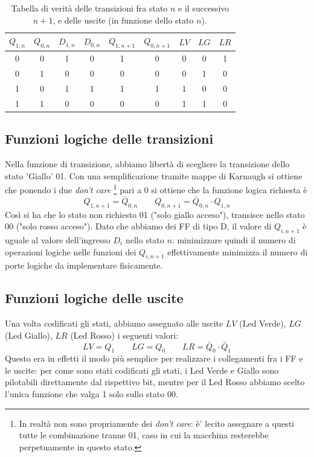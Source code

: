 \documentclass[10pt,a4paper]{article}
\begin{document}
\begin{table}[!htb]
\centering
\begin{tabular}{|c|c|c|c||c|c||c|c|c|}
\hline
$Q_{1,n}$ & $Q_{0,n}$ & $D_{1, n}$ & $D_{0, n}$& $Q_{1,n+1}$ & $Q_{0,n+1}$ & $LV$ & $LG$ & $LR$\\
\hline
0 & 0 & 1 & 0 & 1 & 0 & 0 & 0 & 1 \\
0 & 1 & 0 & 0 & 0 & 0 & 0 & 1 & 0\\
1 & 0 & 1 & 1 & 1 & 1 & 1 & 0 & 0\\
1 & 1 & 0 & 0 & 0 & 0 & 1 & 1 & 0\\
\hline
\end{tabular}
\caption{Tabella di verità delle transizioni fra stato $n$ e il successivo $n+1$, e delle uscite (in funzione dello stato $n$).\label{tab:transizioneenabled}}
\end{table}
\subsection{Funzioni logiche delle transizioni}
Nella funzione di transizione, abbiamo libertà di scegliere la transizione dello stato 'Giallo' 01.
Con una semplificazione tramite mappe di Karnaugh si ottiene che ponendo i due \emph{don't care} 
\footnote{In realtà non sono propriamente dei \emph{don't care}: è' lecito assegnare a questi  tutte le combinazione tranne 01, caso in cui la macchina resterebbe perpetuamente in questo stato.} pari a 0 si ottiene che la funzione logica richiesta è \begin{equation}
Q_{1, n+1} = \bar {Q}_{0,n} \qquad Q_{0,n+1} = \bar {Q}_{0,n} \cdot Q_{1,n} 
\end{equation}
Così si ha che lo stato non richiesto 01 ("solo giallo acceso"), transisce nello stato 00 ("solo rosso acceso").
Dato che abbiamo dei FF di tipo D, il valore di $Q_{i, n+1}$ è uguale al valore dell'ingresso $D_i$ nello stato $n$: minimizzare quindi il numero di operazioni logiche nelle funzioni dei $Q_{i,n+1}$ effettivamente minimizza il numero di porte logiche da implementare fisicamente.

\subsection{Funzioni logiche delle uscite}
Una volta codificati gli stati, abbiamo assegnato alle uscite $LV$ (Led Verde), $LG$ (Led Giallo), $LR$ (Led Rosso) i seguenti valori:
\begin{equation}
LV = Q_1 \qquad LG = Q_0 \qquad LR = \bar{Q}_0\cdot \bar{Q}_1
\end{equation}
Questo era in effetti il modo più semplice per realizzare i collegamenti fra i FF e le uscite: per come sono stati codificati gli stati, i Led Verde e Giallo sono pilotabili direttamente dal rispettivo bit, mentre per il Led Rosso abbiamo scelto l'unica funzione che valga 1 solo sullo stato 00. 
\end{document}
